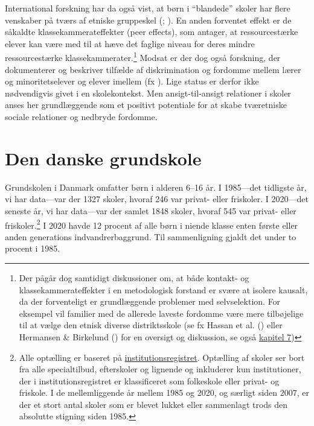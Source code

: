 \documentclass[
]{book}
\begin{document}
International forskning har da også vist, at børn i ``blandede'' skoler har flere venskaber på tværs af etniske gruppeskel (; ). En anden forventet effekt er de såkaldte klassekammerateffekter (peer effects), som antager, at ressourcestærke elever kan være med til at hæve det faglige niveau for deres mindre ressourcestærke klassekammerater.\footnote{Der pågår dog samtidigt diskussioner om, at både kontakt- og klassekammerateffekter i en metodologisk forstand er svære at isolere kausalt, da der forventeligt er grundlæggende problemer med selvselektion. For eksempel vil familier med de allerede laveste fordomme være mere tilbøjelige til at vælge den etnisk diverse distriktsskole (se fx Hassan et al. () eller Hermansen \& Birkelund () for en oversigt og diskussion, se også \hyperref[kap7]{kapitel 7})} Modsat er der dog også forskning, der dokumenterer og beskriver tilfælde af diskrimination og fordomme mellem lærer og minoritetselever og elever imellem (fx ). Lige status er derfor ikke nødvendigvis givet i en skolekontekst. Men ansigt-til-ansigt relationer i skoler anses her grundlæggende som et positivt potentiale for at skabe tværetniske sociale relationer og nedbryde fordomme.

\section{Den danske grundskole}\label{den-danske-grundskole}

Grundskolen i Danmark omfatter børn i alderen 6--16 år. I 1985---det tidligste år, vi har data---var der 1327 skoler, hvoraf 246 var privat- eller friskoler. I 2020---det seneste år, vi har data---var der samlet 1848 skoler, hvoraf 545 var privat- eller friskoler.\footnote{Alle optælling er baseret på \href{https://data.stil.dk/InstregV2/Default.aspx?ReturnUrl=\%2finstregv2\%2f&AspxAutoDetectCookieSupport=1}{institutionsregistret}. Optælling af skoler ser bort fra alle specialtilbud, efterskoler og lignende og inkluderer kun institutioner, der i institutionsregistret er klassificeret som folkeskole eller privat- og friskole. I de mellemliggende år mellem 1985 og 2020, og særligt siden 2007, er der et stort antal skoler som er blevet lukket eller sammenlagt trods den absolutte stigning siden 1985.} I 2020 havde 12 procent af alle børn i niende klasse enten første eller anden generations indvandrerbaggrund. Til sammenligning gjaldt det under to procent i 1985.
\end{document}
